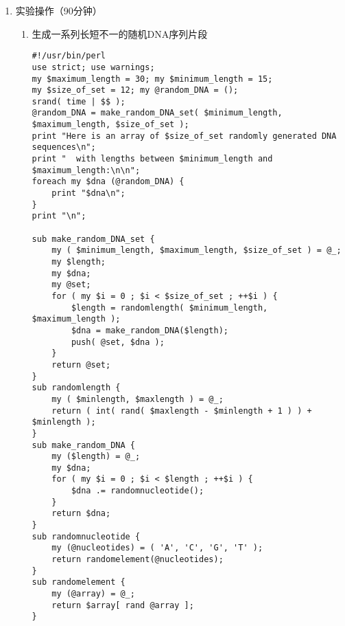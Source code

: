 \documentclass{TIJMUjiaoanSY}
\begin{document}
\firstTail

\newpage
\otherHeader

\begin{enumerate}
  \item 实验操作（90分钟）
    \begin{enumerate}
      \item 生成一系列长短不一的随机DNA序列片段
\begin{verbatim}
#!/usr/bin/perl
use strict; use warnings;
my $maximum_length = 30; my $minimum_length = 15;
my $size_of_set = 12; my @random_DNA = ();
srand( time | $$ );
@random_DNA = make_random_DNA_set( $minimum_length, $maximum_length, $size_of_set );
print "Here is an array of $size_of_set randomly generated DNA sequences\n";
print "  with lengths between $minimum_length and $maximum_length:\n\n";
foreach my $dna (@random_DNA) {
    print "$dna\n";
}
print "\n";

sub make_random_DNA_set {
    my ( $minimum_length, $maximum_length, $size_of_set ) = @_;
    my $length;
    my $dna;
    my @set;
    for ( my $i = 0 ; $i < $size_of_set ; ++$i ) {
        $length = randomlength( $minimum_length, $maximum_length );
        $dna = make_random_DNA($length);
        push( @set, $dna );
    }
    return @set;
}
sub randomlength {
    my ( $minlength, $maxlength ) = @_;
    return ( int( rand( $maxlength - $minlength + 1 ) ) + $minlength );
}
sub make_random_DNA {
    my ($length) = @_;
    my $dna;
    for ( my $i = 0 ; $i < $length ; ++$i ) {
        $dna .= randomnucleotide();
    }
    return $dna;
}
sub randomnucleotide {
    my (@nucleotides) = ( 'A', 'C', 'G', 'T' );
    return randomelement(@nucleotides);
}
sub randomelement {
    my (@array) = @_;
    return $array[ rand @array ];
}
\end{verbatim}

\otherTail
\newpage
\otherHeader


\end{enumerate}
\end{enumerate}
\end{document}
